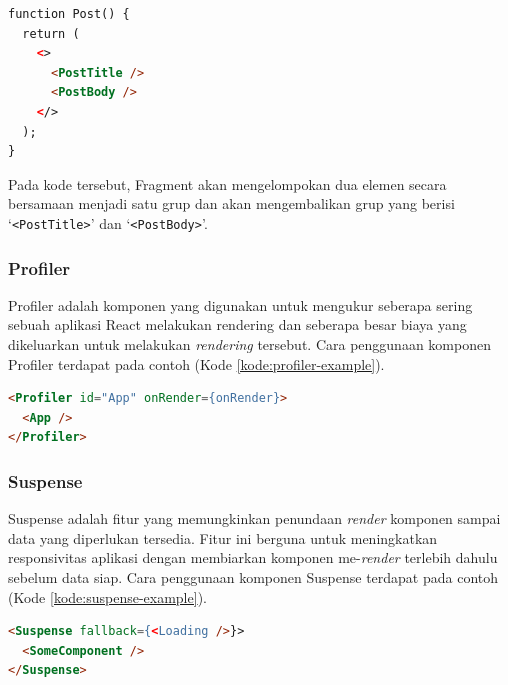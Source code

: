 \begin{lstlisting}[language=HTML, caption=Contoh Potongan Kode Fragment, label=kode:fragment-example]
function Post() {
  return (
    <>
      <PostTitle />
      <PostBody />
    </>
  );
}
\end{lstlisting}

Pada kode tersebut, Fragment akan mengelompokan dua elemen secara bersamaan menjadi satu grup dan akan mengembalikan grup yang berisi `\texttt{<PostTitle>}' dan `\texttt{<PostBody>}'.

\subsubsection{Profiler}
Profiler adalah komponen yang digunakan untuk mengukur seberapa sering sebuah aplikasi React melakukan rendering dan seberapa besar biaya yang dikeluarkan untuk melakukan \textit{rendering} tersebut. Cara penggunaan komponen Profiler terdapat pada contoh (Kode \ref{kode:profiler-example}).

\begin{lstlisting}[language=HTML, caption=Contoh Potongan Kode Profiler, label=kode:profiler-example]
<Profiler id="App" onRender={onRender}>
  <App />
</Profiler>
\end{lstlisting}

\subsubsection{Suspense}
Suspense adalah fitur yang memungkinkan penundaan \textit{render} komponen sampai data yang diperlukan tersedia. Fitur ini berguna untuk meningkatkan responsivitas aplikasi dengan membiarkan komponen me-\textit{render} terlebih dahulu sebelum data siap. Cara penggunaan komponen Suspense terdapat pada contoh (Kode \ref{kode:suspense-example}).

\begin{lstlisting}[language=HTML, caption=Contoh Potongan Kode Suspense, label=kode:suspense-example]
<Suspense fallback={<Loading />}>
  <SomeComponent />
</Suspense>
\end{lstlisting}

